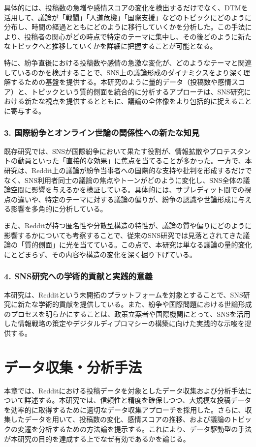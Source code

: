 \documentclass[11pt, a4j]{jreport}
\begin{document}
    具体的には、投稿数の急増や感情スコアの変化を検出するだけでなく、DTMを活用して、議論が「戦闘」「人道危機」「国際支援」などのトピックにどのように分布し、時間の経過とともにどのように移行していくかを分析した。この手法により、投稿者の関心がどの時点で特定のテーマに集中し、その後どのように新たなトピックへと推移していくかを詳細に把握することが可能となる。

    特に、紛争直後における投稿数や感情の急激な変化が、どのようなテーマと関連しているのかを検討することで、SNS上の議論形成のダイナミクスをより深く理解するための基盤を提供する。本研究のように量的データ（投稿数や感情スコア）と、トピックという質的側面を統合的に分析するアプローチは、SNS研究における新たな視点を提供するとともに、議論の全体像をより包括的に捉えることに寄与する。

    \subsection*{3. 国際紛争とオンライン世論の関係性への新たな知見}
    既存研究では、SNSが国際紛争において果たす役割が、情報拡散やプロテスタントの動員といった「直接的な効果」に焦点を当てることが多かった。一方で、本研究は、Reddit上の議論が紛争当事者への国際的な支持や批判を形成するだけでなく、SNS利用者同士の議論の焦点やトーンがどのように変化し、SNS全体の議論空間に影響を与えるかを検証している。具体的には、サブレディット間での視点の違いや、特定のテーマに対する議論の偏りが、紛争の認識や世論形成に与える影響を多角的に分析している。

    また、Redditが持つ匿名性や分散型構造の特性が、議論の質や偏りにどのように影響するかについても考察することで、従来のSNS研究では見落とされてきた議論の「質的側面」に光を当てている。この点で、本研究は単なる議論の量的変化にとどまらず、その内容や構造の変化を深く掘り下げている。

    \subsection*{4. SNS研究への学術的貢献と実践的意義}
    本研究は、Redditという未開拓のプラットフォームを対象とすることで、SNS研究に新たな学術的貢献を提供している。また、紛争や国際問題における世論形成のプロセスを明らかにすることは、政策立案者や国際機関にとって、SNSを活用した情報戦略の策定やデジタルディプロマシーの構築に向けた実践的な示唆を提供する。

    \chapter{データ収集・分析手法}
    本章では、Redditにおける投稿データを対象としたデータ収集および分析手法について詳述する。本研究では、信頼性と精度を確保しつつ、大規模な投稿データを効率的に取得するために適切なデータ収集アプローチを採用した。さらに、収集したデータを用いて、投稿数の変化、感情スコアの推移、および議論のトピックの変遷を分析するための方法論を提示する。これにより、データ駆動型の手法が本研究の目的を達成する上でなぜ有効であるかを論じる。
\end{document}
